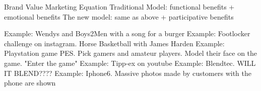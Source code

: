Brand Value Marketing Equation
    Traditional Model: functional benefits + emotional benefits
    The new model: same as above + participative benefits

Example: Wendys and Boys2Men with a song for a burger
Example: Footlocker challenge on instagram. Horse Basketball with James Harden
Example: Playstation game PES. Pick gamers and amateur players. Model their face on the game. "Enter the game"
Example: Tipp-ex on youtube
Example: Blendtec. WILL IT BLEND????
Example: Iphone6. Massive photos made by customers with the phone are shown
